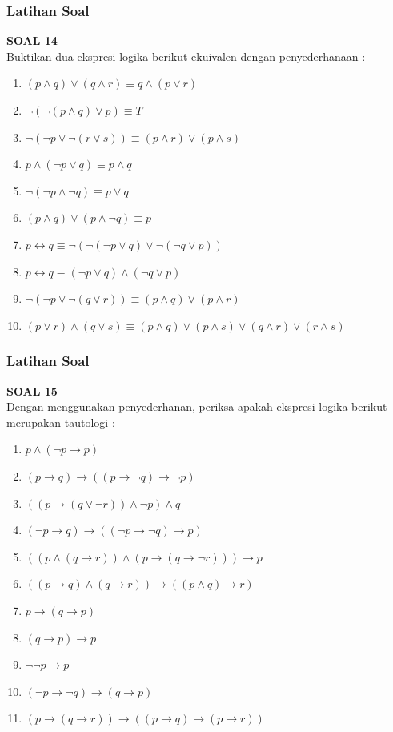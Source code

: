 \documentclass[handout]{beamer}
\theoremstyle{definition}
\theoremstyle{example}
\begin{document}
\begin{frame}[shrink]
	\frametitle{Latihan Soal}
	\textbf{SOAL 14}\\
	Buktikan dua ekspresi logika berikut ekuivalen dengan penyederhanaan :\\
	\begin{enumerate}
		\item $ (p \wedge q)\vee (q \wedge r) \equiv q \wedge (p \vee r) $
		\item $ \neg(\neg(p \wedge q)\vee p) \equiv T$
		\item $\neg(\neg p \vee \neg(r \vee s))\equiv (p \wedge r)\vee (p \wedge s)$	
		\item $p \wedge (\neg p \vee q)\equiv p \wedge q$
		\item $\neg(\neg p \wedge \neg q)\equiv p \vee q$
		\item $(p \wedge q)\vee(p \wedge \neg q)\equiv p$
		\item $p \leftrightarrow q \equiv \neg(\neg(\neg p \vee q)\vee \neg(\neg q \vee p)) $
		\item $p \leftrightarrow q \equiv (\neg p \vee q) \wedge (\neg q \vee p) $
		\item $ \neg(\neg p \vee \neg(q \vee r))\equiv (p \wedge q) \vee (p \wedge r) $
		\item $(p \vee r)\wedge(q \vee s)\equiv (p \wedge q)\vee(p \wedge s)\vee(q \wedge r)\vee(r \wedge s) $			
	\end{enumerate}	
\end{frame}

\begin{frame}
	\frametitle{Latihan Soal}
	\textbf{SOAL 15}\\
	Dengan menggunakan penyederhanan, periksa apakah ekspresi logika berikut merupakan tautologi :\\
	\begin{enumerate}
		\item $p \wedge (\neg p \rightarrow p) $
		\item $(p \rightarrow q)\rightarrow((p \rightarrow \neg q)\rightarrow \neg p) $	
		\item $((p \rightarrow (q \vee \neg r))\wedge \neg p)\wedge q $
		\item $(\neg p \rightarrow q)\rightarrow((\neg p \rightarrow \neg q)\rightarrow p) $	
		\item $((p \wedge (q \rightarrow r))\wedge(p \rightarrow(q \rightarrow \neg r)))\rightarrow p $
		\item $((p \rightarrow q)\wedge(q \rightarrow r))\rightarrow((p \wedge q)\rightarrow r) $
		\item $p \rightarrow (q \rightarrow p) $
		\item $(q \rightarrow p) \rightarrow p $
		\item $\neg \neg p \rightarrow p$
		\item $(\neg p \rightarrow \neg q)\rightarrow(q \rightarrow p)$	
		\item $(p \rightarrow (q \rightarrow r))\rightarrow((p \rightarrow q)\rightarrow(p \rightarrow r))$			
	\end{enumerate}	
\end{frame}

		
\end{document}
